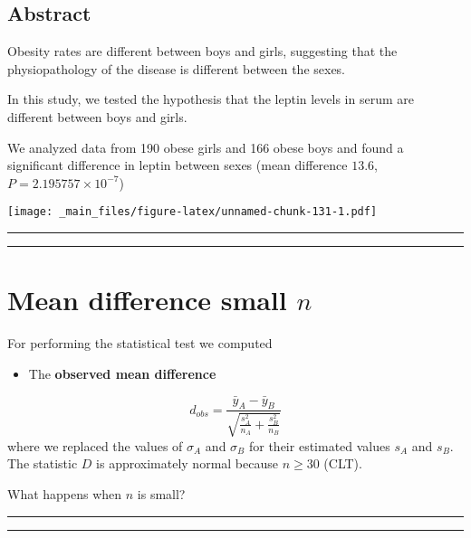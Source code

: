 \documentclass[
]{book}
\providecommand{\tightlist}{%
  \setlength{\itemsep}{0pt}\setlength{\parskip}{0pt}}
\begin{document}
\hypertarget{abstract}{%
\subsection{Abstract}\label{abstract}}

Obesity rates are different between boys and girls, suggesting that the physiopathology of the disease is different between the sexes.

In this study, we tested the hypothesis that the leptin levels in serum are different between boys and girls.

We analyzed data from 190 obese girls and 166 obese boys and found a significant difference in leptin between sexes (mean difference \(13.6\), \(P=2.195757 \times 10^{-7}\))

\texttt{[image: \_main\_files/figure-latex/unnamed-chunk-131-1.pdf]}

\begin{center}\rule{0.5\linewidth}{0.5pt}\end{center}

\begin{center}\rule{0.5\linewidth}{0.5pt}\end{center}

\hypertarget{mean-difference-small-n}{%
\section{\texorpdfstring{Mean difference small \(n\)}{Mean difference small n}}\label{mean-difference-small-n}}

For performing the statistical test we computed

\begin{itemize}
\tightlist
\item
  The \textbf{observed mean difference}
\end{itemize}

\[d_{obs}=\frac{\bar{y}_A-\bar{y}_B }{\sqrt{\frac{s^2_A}{n_A}+\frac{s^2_B}{n_B}}}\]
where we replaced the values of \(\sigma_A\) and \(\sigma_B\) for their estimated values \(s_A\) and \(s_B\). The statistic \(D\) is approximately normal because \(n\ge 30\) (CLT).

What happens when \(n\) is small?

\begin{center}\rule{0.5\linewidth}{0.5pt}\end{center}

\begin{center}\rule{0.5\linewidth}{0.5pt}\end{center}
\end{document}
